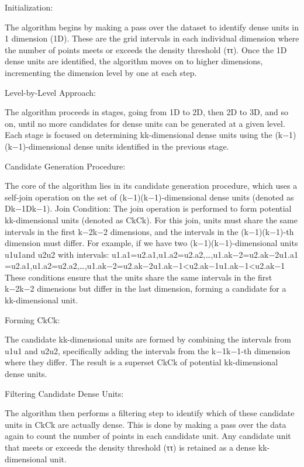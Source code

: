 Initialization:

    The algorithm begins by making a pass over the dataset to identify dense units in 1 dimension (1D). These are the grid intervals in each individual dimension where the number of points meets or exceeds the density threshold (ττ).
    Once the 1D dense units are identified, the algorithm moves on to higher dimensions, incrementing the dimension level by one at each step.

Level-by-Level Approach:

    The algorithm proceeds in stages, going from 1D to 2D, then 2D to 3D, and so on, until no more candidates for dense units can be generated at a given level. Each stage is focused on determining kk-dimensional dense units using the (k−1)(k−1)-dimensional dense units identified in the previous stage.

Candidate Generation Procedure:

    The core of the algorithm lies in its candidate generation procedure, which uses a self-join operation on the set of (k−1)(k−1)-dimensional dense units (denoted as Dk−1Dk−1​).
    Join Condition: The join operation is performed to form potential kk-dimensional units (denoted as CkCk​). For this join, units must share the same intervals in the first k−2k−2 dimensions, and the intervals in the (k−1)(k−1)-th dimension must differ.
        For example, if we have two (k−1)(k−1)-dimensional units u1u1​ and u2u2​ with intervals:
            u1.a1=u2.a1,u1.a2=u2.a2,…,u1.ak−2=u2.ak−2u1​.a1​=u2​.a1​,u1​.a2​=u2​.a2​,…,u1​.ak−2​=u2​.ak−2​
            u1.ak−1<u2.ak−1u1​.ak−1​<u2​.ak−1​
        These conditions ensure that the units share the same intervals in the first k−2k−2 dimensions but differ in the last dimension, forming a candidate for a kk-dimensional unit.

Forming CkCk​:

    The candidate kk-dimensional units are formed by combining the intervals from u1u1​ and u2u2​, specifically adding the intervals from the k−1k−1-th dimension where they differ.
    The result is a superset CkCk​ of potential kk-dimensional dense units.

Filtering Candidate Dense Units:

    The algorithm then performs a filtering step to identify which of these candidate units in CkCk​ are actually dense. This is done by making a pass over the data again to count the number of points in each candidate unit.
    Any candidate unit that meets or exceeds the density threshold (ττ) is retained as a dense kk-dimensional unit.

